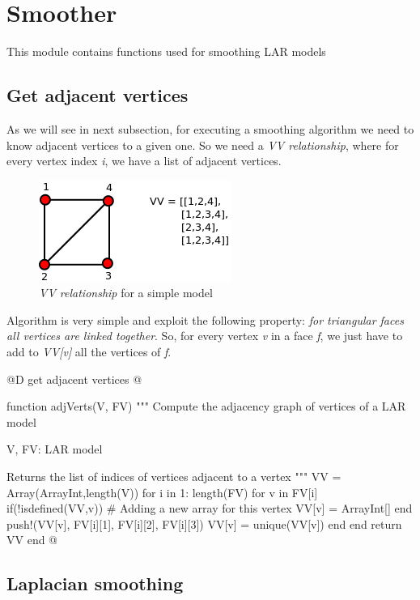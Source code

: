 \documentclass[11pt,oneside]{article}	%
\begin{document}
\section{Smoother}\label{sec:Smoother}
This module contains functions used for smoothing LAR models

\subsection{Get adjacent vertices}\label{sec:adjacent}

As we will see in next subsection, for executing a smoothing algorithm we need to know adjacent vertices to a given one. So we need a \textit{VV relationship}, where for every vertex index \textit{i}, we have a list of adjacent vertices.

\begin{figure}[htb] %
   \centering
   \includegraphics[width=0.40\linewidth]{images/Adjacents.png}
   \caption{\textit{VV relationship} for a simple model}
   \label{fig:adjacents}
\end{figure}

Algorithm is very simple and exploit the following property: \textit{for triangular faces all vertices are linked together}. So, for every vertex \textit{v} in a face \textit{f}, we just have to add to \textit{VV[v]} all the vertices of \textit{f}.

@D get adjacent vertices
@{function adjVerts(V, FV)
  """
  Compute the adjacency graph of vertices
  of a LAR model

  V, FV: LAR model

  Returns the list of indices of vertices adjacent
  to a vertex
  """
  VV = Array(Array{Int},length(V))
  for i in 1: length(FV)
    for v in FV[i]
      if(!isdefined(VV,v))
        # Adding a new array for this vertex
        VV[v] = Array{Int}[]
      end
      push!(VV[v], FV[i][1], FV[i][2], FV[i][3])
      VV[v] = unique(VV[v])
    end
  end
  return VV
end @}

\subsection{Laplacian smoothing}\label{sec:smoothing}
\end{document}
